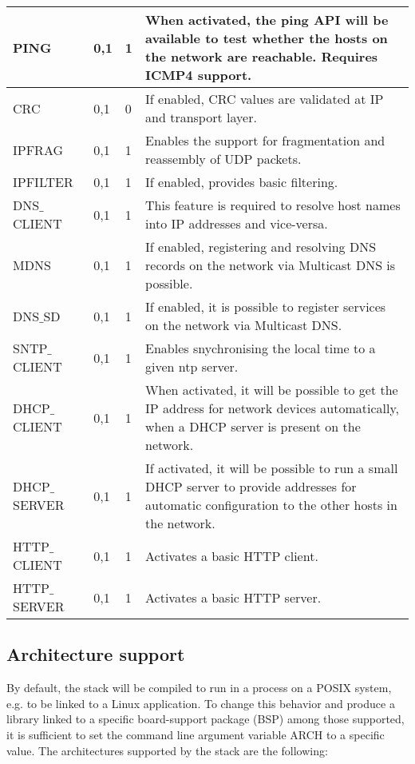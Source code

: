 \begin{longtable}{ | l | l | l | p{5cm} | }
PING&
0,1&
1&
When activated, the ping API will be available to test whether the hosts on the network are reachable.
Requires ICMP4 support.
\\ \hline

CRC&
0,1&
0&
If enabled, CRC values are validated at IP and transport layer.
\\ \hline

IPFRAG&
0,1&
1&
Enables the support for fragmentation and reassembly of UDP packets.
\\ \hline

IPFILTER&
0,1&
1&
If enabled, provides basic filtering.
\\ \hline

DNS$\_$CLIENT&
0,1&
1&
This feature is required to resolve host names into IP addresses and vice-versa.
\\ \hline

MDNS&
0,1&
1&
If enabled, registering and resolving DNS records on the network via Multicast DNS is possible.
\\ \hline

DNS$\_$SD&
0,1&
1&
If enabled, it is possible to register services on the network via Multicast DNS.
\\ \hline

SNTP$\_$CLIENT&
0,1&
1&
Enables snychronising the local time to a given ntp server.
\\ \hline

DHCP$\_$CLIENT&
0,1&
1&
When activated, it will be possible to get the IP address for network devices automatically, when a DHCP
server is present on the network.
\\ \hline

DHCP$\_$SERVER&
0,1&
1&
If activated, it will be possible to run a small DHCP server to provide addresses for automatic configuration
to the other hosts in the network.
\\ \hline

HTTP$\_$CLIENT&
0,1&
1&
Activates a basic HTTP client.
\\ \hline

HTTP$\_$SERVER&
0,1&
1&
Activates a basic HTTP server.
\\ \hline

\end{longtable}

\subsection{Architecture support}
By default, the stack will be compiled to run in a process on a POSIX
system, e.g. to be linked to a Linux application. To change this behavior
and produce a library linked to a specific board-support package (BSP)
among those supported, it is sufficient to set the command line argument
variable ARCH to a specific value. The architectures supported by the stack
are the following:


